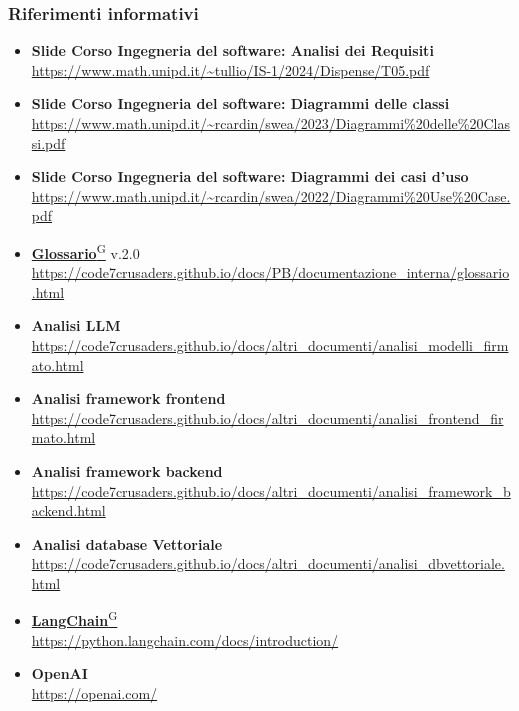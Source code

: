 \subsubsection{Riferimenti informativi}
\begin{itemize}
    \item \textbf{Slide Corso Ingegneria del software: Analisi dei Requisiti} \\ \url{https://www.math.unipd.it/~tullio/IS-1/2024/Dispense/T05.pdf}
    \item \textbf{Slide Corso Ingegneria del software: Diagrammi delle classi} \\ \url{https://www.math.unipd.it/~rcardin/swea/2023/Diagrammi%20delle%20Classi.pdf}
    \item \textbf{Slide Corso Ingegneria del software: Diagrammi dei casi d'uso}\\ \url{https://www.math.unipd.it/~rcardin/swea/2022/Diagrammi%20Use%20Case.pdf}
    \item \href{https://code7crusaders.github.io/docs/PB/documentazione_interna/glossario.html#glossario}{\textbf{Glossario}\textsuperscript{G}} v.2.0 \\ \url{https://code7crusaders.github.io/docs/PB/documentazione_interna/glossario.html}
    \item \textbf{Analisi LLM} \\ \url{https://code7crusaders.github.io/docs/altri_documenti/analisi_modelli_firmato.html}
    \item \textbf{Analisi framework frontend} \\ \url{https://code7crusaders.github.io/docs/altri_documenti/analisi_frontend_firmato.html}
    \item \textbf{Analisi framework backend} \\ \url{https://code7crusaders.github.io/docs/altri_documenti/analisi_framework_backend.html}
    \item \textbf{Analisi database Vettoriale} \\ \url{https://code7crusaders.github.io/docs/altri_documenti/analisi_dbvettoriale.html}
    \item \href{https://code7crusaders.github.io/docs/PB/documentazione_interna/glossario.html#langchain}{\textbf{LangChain}\textsuperscript{G}} \\ \url{https://python.langchain.com/docs/introduction/}
    \item \textbf{OpenAI} \\ \url{https://openai.com/}

\end{itemize}
